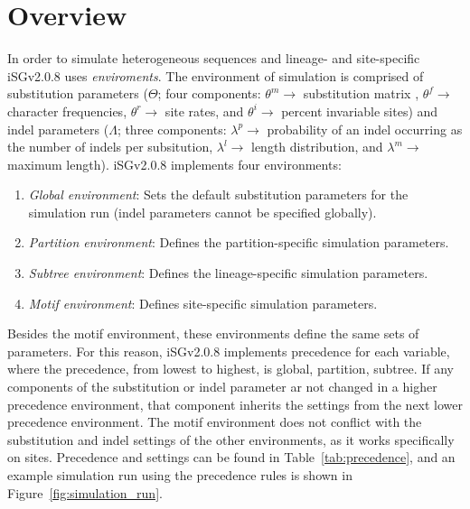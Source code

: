 \documentclass[10pt]{article}
\newcommand{\version}{2.0.8 }
\newcommand{\iSGcurrentshort}{iSGv\version }
\begin{document}
\section{Overview}
\label{sec:overview}

In order to simulate heterogeneous sequences and lineage- and site-specific \iSGcurrentshort uses \textit{enviroments}. The environment of simulation is comprised of
substitution parameters ($\Theta$; four components: $\theta^m \rightarrow$ substitution matrix , $\theta^f \rightarrow$ character frequencies, $\theta^r \rightarrow$ site rates, and $\theta^i\rightarrow$ percent invariable sites) and indel parameters ($\Lambda$; three components: $\lambda^p \rightarrow$ probability of an indel occurring as the number of indels per subsitution, $\lambda^l\rightarrow$ length distribution, and $\lambda^m\rightarrow$ maximum length). \iSGcurrentshort implements four environments: 

\begin{enumerate}
\item \textit{Global environment}: Sets the default substitution parameters for the simulation run (indel parameters cannot be specified globally).
\item \textit{Partition environment}: Defines the partition-specific simulation parameters.
\item \textit{Subtree environment}: Defines the lineage-specific simulation parameters.
\item \textit{Motif environment}: Defines site-specific simulation parameters.
\end{enumerate}

Besides the motif environment, these environments define the same sets of parameters. For this reason, \iSGcurrentshort implements precedence for each variable, where the precedence, from lowest to highest, is global, partition, subtree. If any components of the substitution or indel parameter ar not changed in a higher precedence environment, that component inherits the settings from the next lower precedence environment. The motif environment does not conflict with the substitution and indel settings of the other environments, as it works specifically on sites. Precedence and settings can be found in Table~\ref{tab:precedence}, and an example simulation run using the precedence rules is shown in Figure~\ref{fig:simulation_run}.
\end{document}
